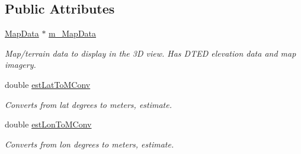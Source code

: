 \subsection*{Public Attributes}
\begin{DoxyCompactItemize}
\item 
\hypertarget{class_viewer3_d_a649e5adedb350c3bf208c4a7ac744eb7}{
\hyperlink{class_map_data}{MapData} $\ast$ \hyperlink{class_viewer3_d_a649e5adedb350c3bf208c4a7ac744eb7}{m\_\-MapData}}
\label{class_viewer3_d_a649e5adedb350c3bf208c4a7ac744eb7}

\begin{DoxyCompactList}\small\item\em Map/terrain data to display in the 3D view. Has DTED elevation data and map imagery. \end{DoxyCompactList}\item 
\hypertarget{class_viewer3_d_a337642f4a062778b0d752cee30768b49}{
double \hyperlink{class_viewer3_d_a337642f4a062778b0d752cee30768b49}{estLatToMConv}}
\label{class_viewer3_d_a337642f4a062778b0d752cee30768b49}

\begin{DoxyCompactList}\small\item\em Converts from lat degrees to meters, estimate. \end{DoxyCompactList}\item 
\hypertarget{class_viewer3_d_abbab74864ae8a29a4adff191376242f2}{
double \hyperlink{class_viewer3_d_abbab74864ae8a29a4adff191376242f2}{estLonToMConv}}
\label{class_viewer3_d_abbab74864ae8a29a4adff191376242f2}

\begin{DoxyCompactList}\small\item\em Converts from lon degrees to meters, estimate. \end{DoxyCompactList}\end{DoxyCompactItemize}
